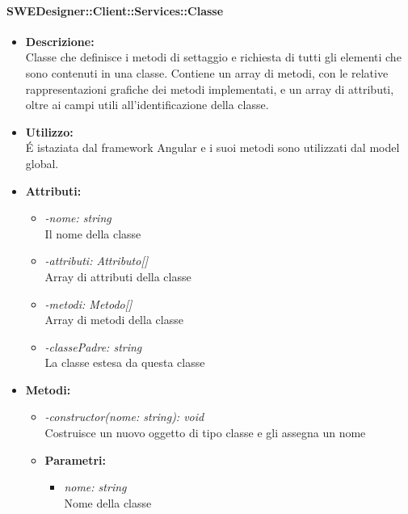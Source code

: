           	\paragraph{SWEDesigner::Client::Services::Classe}
				\begin{itemize}
          			\item \textbf{Descrizione:}\\
          			Classe che definisce i metodi di settaggio e richiesta di tutti gli elementi che sono contenuti in una classe. Contiene un array di metodi, con le relative rappresentazioni grafiche dei metodi implementati, e un array di attributi, oltre ai campi utili all’identificazione della classe.
          			\item \textbf{Utilizzo:}\\
          			É istaziata dal framework Angular e i suoi metodi sono utilizzati dal model global.
          			\item \textbf{Attributi:}\\
          			\begin{itemize}
          				\item \emph{-nome: string}\\
            			Il nome della classe
            			\item \emph{-attributi: Attributo[]}\\
            			Array di attributi della classe
            			\item \emph{-metodi: Metodo[]}\\
            			Array di metodi della classe
            			\item \emph{-classePadre: string}\\
            			La classe estesa da questa classe
          			\end{itemize}
          			\item \textbf{Metodi:}\\
          			\begin{itemize}
          				\item \emph{-constructor(nome: string): void}\\
            			Costruisce un nuovo oggetto di tipo classe e gli assegna un nome
            			\item \textbf{Parametri:}\\
            				\begin{itemize}
            					\item \emph{nome: string}\\
            					Nome della classe

\end{itemize}
\end{itemize}
\end{itemize}
